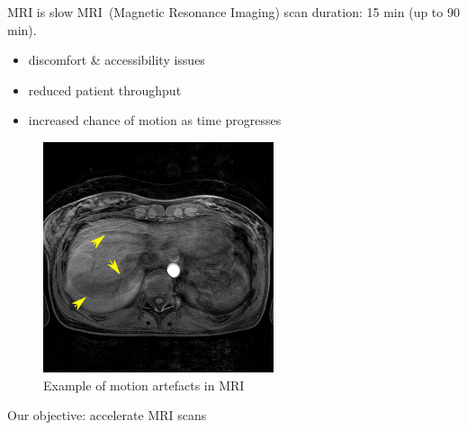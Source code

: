 \documentclass[aspectratio=169,xcolor=dvipsnames]{beamer}
\begin{document}
\begin{frame}{MRI is slow}
    MRI~(Magnetic Resonance Imaging) scan duration: 15 min (up to 90 min).
    \begin{itemize}
        \item discomfort \& accessibility issues
        \item reduced patient throughput
        \item increased chance of motion as time progresses
    \end{itemize}
    \begin{figure}
        \centering
        \includegraphics[]{Figures/intro_figures/motion_mri.png}
        \caption{Example of motion artefacts in MRI}
    \end{figure}
\end{frame}

\begin{frame}{Our objective: accelerate MRI scans}
    \setlength{\parskip}{1ex}
    \begin{multicols}{2}
    \tableofcontents
    \end{multicols}
\end{frame}








% 

\end{document}

